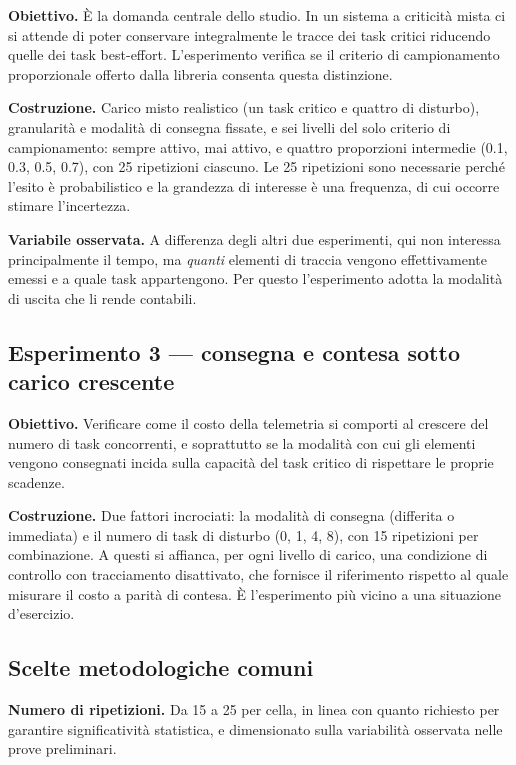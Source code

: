\documentclass[11pt,a4paper]{article}
\begin{document}
\textbf{Obiettivo.} \`E la domanda centrale dello studio. In un sistema a criticit\`a mista ci si
attende di poter conservare integralmente le tracce dei task critici riducendo quelle dei task
best-effort. L'esperimento verifica se il criterio di campionamento proporzionale offerto dalla
libreria consenta questa distinzione.

\textbf{Costruzione.} Carico misto realistico (un task critico e quattro di disturbo), granularit\`a
e modalit\`a di consegna fissate, e sei livelli del solo criterio di campionamento: sempre attivo,
mai attivo, e quattro proporzioni intermedie (0.1, 0.3, 0.5, 0.7), con 25 ripetizioni ciascuno. Le
25 ripetizioni sono necessarie perch\'e l'esito \`e probabilistico e la grandezza di interesse \`e
una frequenza, di cui occorre stimare l'incertezza.

\textbf{Variabile osservata.} A differenza degli altri due esperimenti, qui non interessa
principalmente il tempo, ma \emph{quanti} elementi di traccia vengono effettivamente emessi e a
quale task appartengono. Per questo l'esperimento adotta la modalit\`a di uscita che li rende
contabili.

\subsection{Esperimento 3 --- consegna e contesa sotto carico crescente}

\textbf{Obiettivo.} Verificare come il costo della telemetria si comporti al crescere del numero di
task concorrenti, e soprattutto se la modalit\`a con cui gli elementi vengono consegnati incida
sulla capacit\`a del task critico di rispettare le proprie scadenze.

\textbf{Costruzione.} Due fattori incrociati: la modalit\`a di consegna (differita o immediata) e il
numero di task di disturbo (0, 1, 4, 8), con 15 ripetizioni per combinazione. A questi si affianca,
per ogni livello di carico, una condizione di controllo con tracciamento disattivato, che fornisce
il riferimento rispetto al quale misurare il costo a parit\`a di contesa. \`E l'esperimento pi\`u
vicino a una situazione d'esercizio.

\subsection{Scelte metodologiche comuni}

\textbf{Numero di ripetizioni.} Da 15 a 25 per cella, in linea con quanto richiesto per garantire
significativit\`a statistica, e dimensionato sulla variabilit\`a osservata nelle prove preliminari.
\end{document}
